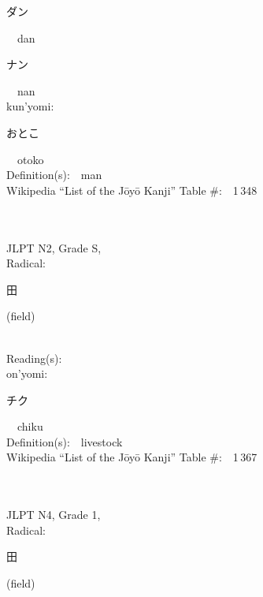 \begin{multicols}{2}
{\hspace*{2em}}{\begin{CJK}{UTF8}{min} ダン \end{CJK}}\ \ dan\ \ \\
{\hspace*{2em}}{\begin{CJK}{UTF8}{min} ナン \end{CJK}}\ \ nan\ \ \\
{\hspace*{1em}}kun'yomi:\ \ \\
{\hspace*{2em}}{\begin{CJK}{UTF8}{min} おとこ \end{CJK}}\ \ otoko\ \ \\
Definition(s):\ \ man \\
Wikipedia ``List of the J\=oy\=o Kanji'' Table \#:\ \ 1\,348 \\
\ \ \\
{\fontsize{34pt}{40pt}  }\ \ \\  %
{JLPT N2, Grade S, \\Radical:\ \ {\begin{CJK}{UTF8}{min} 田 \end{CJK}} (field) } \\
Reading(s):\ \ \\
{\hspace*{1em}}on'yomi:\ \ \\
{\hspace*{2em}}{\begin{CJK}{UTF8}{min} チク \end{CJK}}\ \ chiku\ \ \\
Definition(s):\ \ livestock \\
Wikipedia ``List of the J\=oy\=o Kanji'' Table \#:\ \ 1\,367 \\
\ \ \\
{\fontsize{34pt}{40pt}  }\ \ \\  %
{JLPT N4, Grade 1, \\Radical:\ \ {\begin{CJK}{UTF8}{min} 田 \end{CJK}} (field) } \\

\end{multicols}
